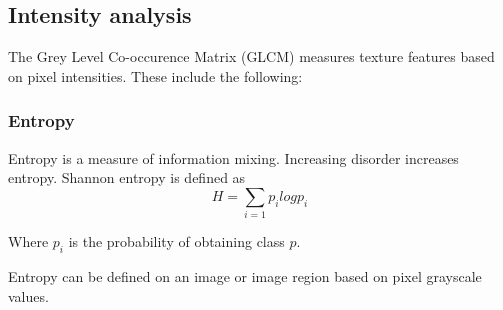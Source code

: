 \subsection{Intensity analysis}

The Grey Level Co-occurence Matrix (GLCM)\cite{GLCM} measures texture features based on pixel intensities.
These include the following:

\subsubsection{Entropy}
Entropy is a measure of information mixing. Increasing disorder increases entropy. Shannon entropy is defined as \begin{equation}
    H = \sum_{i=1} {p_i log p_i}
\end{equation}

Where $p_i$ is the probability of obtaining class $p$.

Entropy can be defined on an image or image region based on pixel grayscale values.